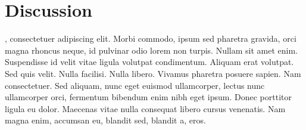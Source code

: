 \chapter{Discussion}

, consectetuer adipiscing elit. Morbi commodo,
ipsum sed pharetra gravida, orci magna rhoncus neque, id pulvinar odio lorem non turpis.
Nullam sit amet enim. Suspendisse id velit vitae ligula volutpat condimentum. Aliquam
erat volutpat. Sed quis velit. Nulla facilisi. Nulla libero. Vivamus pharetra posuere
sapien. Nam consectetuer. Sed aliquam, nunc eget euismod ullamcorper, lectus nunc
ullamcorper orci, fermentum bibendum enim nibh eget ipsum. Donec porttitor ligula eu
dolor. Maecenas vitae nulla consequat libero cursus venenatis. Nam magna enim, accumsan
eu, blandit sed, blandit a, eros.